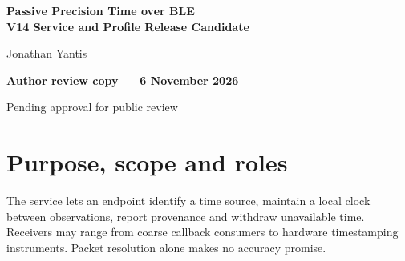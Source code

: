 \documentclass[11pt,letterpaper]{article}
\begin{document}
\thispagestyle{plain}
\begin{center}
{\LARGE\bfseries Passive Precision Time over BLE\\V14 Service and Profile Release Candidate\par}
\vspace{8pt}Jonathan Yantis\par
{\small\bfseries Author review copy --- 6 November 2026}\par
{\small Pending approval for public review}
\end{center}
\begin{abstract}
Passive Precision Time over BLE (PToB) transfers shared time to heterogeneous Bluetooth Low Energy receivers. Periodic advertisements identify physical transmissions; later corrections let receivers discipline local clocks without a transaction for each timestamp. This release candidate pins the implemented BLE wire profile: G7V4 grandmaster control, GR3 root and RC7/profile 5 relay timing, JOIN5 and revision 8 relay admission, and coarse civil-time metadata. It defines when a source may serve, when a HOT successor may take over, and when a receiver must withdraw time. Byte compatibility, physical failover, and calibrated output accuracy are separate review gates.
\end{abstract}
\section{Purpose, scope and roles}
The service lets an endpoint identify a time source, maintain a local clock between observations, report provenance and withdraw unavailable time. Receivers may range from coarse callback consumers to hardware timestamping instruments. Packet resolution alone makes no accuracy promise.
\end{document}

